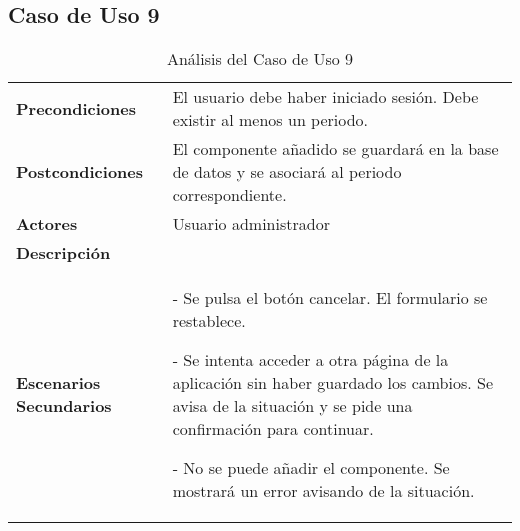 \subsection{Caso de Uso 9}
\begin{table}[H]
  \centering
  \vspace{-5mm}
  \caption{Análisis del Caso de Uso 9}
    \begin{tabular}{p{7.5em}p{24.145em}}
    \toprule
    \rowcolor[rgb]{ .871,  .918,  .965} \multicolumn{2}{p{31.645em}}{\textbf{Añadir componente}} \\
    \midrule
    \rowcolor[rgb]{ .906,  .902,  .902} \textbf{Precondiciones} & \cellcolor[rgb]{ 1,  1,  1}El usuario debe haber iniciado sesión. Debe existir al menos un periodo. \\
    \midrule
    \rowcolor[rgb]{ .906,  .902,  .902} \textbf{Postcondiciones} & \cellcolor[rgb]{ 1,  1,  1}El componente añadido se guardará en la base de datos y se asociará al periodo correspondiente. \\
    \midrule
    \rowcolor[rgb]{ .906,  .902,  .902} \textbf{Actores} & \cellcolor[rgb]{ 1,  1,  1}Usuario administrador \\
    \midrule
    \rowcolor[rgb]{ .906,  .902,  .902} \textbf{Descripción} & \cellcolor[rgb]{ 1,  1,  1} \\
    \midrule
    \rowcolor[rgb]{ .906,  .902,  .902} \textbf{Escenarios          Secundarios} & \cellcolor[rgb]{ 1,  1,  1}- Se pulsa el botón cancelar. El formulario se restablece.\par - Se intenta acceder a otra página de la aplicación sin haber guardado los cambios. Se avisa de la situación y se pide una confirmación para continuar.\par - No se puede añadir el componente. Se mostrará un error avisando de la situación.  \\
    \bottomrule
    \end{tabular}%
\end{table}%
 
